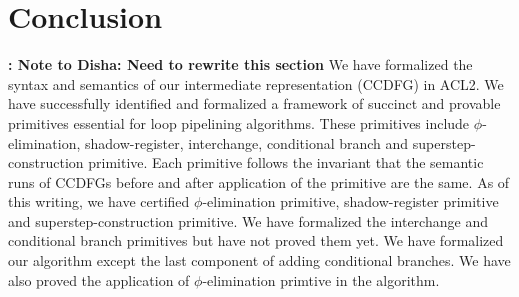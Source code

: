 
\section{Conclusion}
{\bf: Note to Disha: Need to rewrite this section}
We have formalized the syntax and semantics of our intermediate representation (CCDFG) in ACL2. We have successfully identified and formalized a framework of succinct and provable primitives essential for loop pipelining algorithms.
These primitives include $\phi$-elimination, shadow-register, interchange, conditional branch and superstep-construction primitive. Each primitive follows the invariant that the semantic runs of CCDFGs before and after application of the primitive are the same. As of this writing, we have certified $\phi$-elimination primitive, shadow-register primitive and superstep-construction primitive. We have formalized the interchange and conditional branch primitives but have not proved them yet.
We have formalized our algorithm except the last component of adding conditional branches. We have also proved the 
application of $\phi$-elimination primtive in the algorithm.


